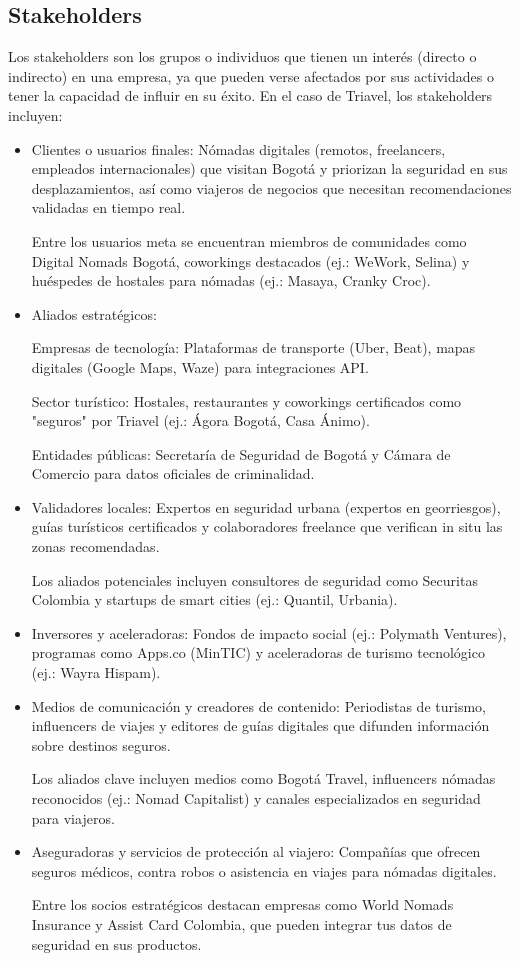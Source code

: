 \subsection{Stakeholders}
Los stakeholders son los grupos o individuos que tienen un interés (directo o indirecto) en una empresa, ya que pueden verse afectados por sus actividades o tener la capacidad de influir en su éxito. En el caso de Triavel, los stakeholders incluyen: 
\begin{itemize}
\item Clientes o usuarios finales: Nómadas digitales (remotos, freelancers, empleados internacionales) que visitan Bogotá y priorizan la seguridad en sus desplazamientos, así como viajeros de negocios que necesitan recomendaciones validadas en tiempo real.

Entre los usuarios meta se encuentran miembros de comunidades como Digital Nomads Bogotá, coworkings destacados (ej.: WeWork, Selina) y huéspedes de hostales para nómadas (ej.: Masaya, Cranky Croc).

\item Aliados estratégicos:

Empresas de tecnología: Plataformas de transporte (Uber, Beat), mapas digitales (Google Maps, Waze) para integraciones API.

Sector turístico: Hostales, restaurantes y coworkings certificados como "seguros" por Triavel (ej.: Ágora Bogotá, Casa Ánimo).

Entidades públicas: Secretaría de Seguridad de Bogotá y Cámara de Comercio para datos oficiales de criminalidad.

\item Validadores locales: Expertos en seguridad urbana (expertos en georriesgos), guías turísticos certificados y colaboradores freelance que verifican in situ las zonas recomendadas.

Los aliados potenciales incluyen consultores de seguridad como Securitas Colombia y startups de smart cities (ej.: Quantil, Urbania).

\item Inversores y aceleradoras: Fondos de impacto social (ej.: Polymath Ventures), programas como Apps.co (MinTIC) y aceleradoras de turismo tecnológico (ej.: Wayra Hispam).
\item Medios de comunicación y creadores de contenido: Periodistas de turismo, influencers de viajes y editores de guías digitales que difunden información sobre destinos seguros.

Los aliados clave incluyen medios como Bogotá Travel, influencers nómadas reconocidos (ej.: Nomad Capitalist) y canales especializados en seguridad para viajeros.

\item Aseguradoras y servicios de protección al viajero: Compañías que ofrecen seguros médicos, contra robos o asistencia en viajes para nómadas digitales.

Entre los socios estratégicos destacan empresas como World Nomads Insurance y Assist Card Colombia, que pueden integrar tus datos de seguridad en sus productos.
\end{itemize}
